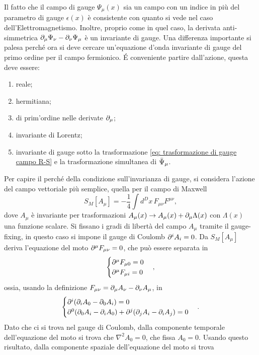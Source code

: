 Il fatto che il campo di gauge $\Psi_\mu(x)$ sia un campo con un indice in più del parametro di gauge $\epsilon(x)$ è consistente con quanto si vede nel caso dell'Elettromagnetismo. Inoltre, proprio come in quel caso, la derivata anti-simmetrica $\partial_\mu\Psi_\nu - \partial_\nu\Psi_\mu$ è un invariante di gauge. Una differenza importante si palesa perché ora si deve cercare un'equazione d'onda invariante di gauge del primo ordine per il campo fermionico. \'E conveniente partire dall'azione, questa deve essere:
\begin{enumerate}
    \item reale;
    \item hermitiana;
    \item di prim'ordine nelle derivate $\partial_\mu$;
    \item invariante di Lorentz;
    \item invariante di gauge sotto la trasformazione \eqref{eq: trasformazione di gauge campo R-S} e la trasformazione simultanea di $\bar{\Psi}_\mu$.
\end{enumerate} 
Per capire il perché della condizione sull'invarianza di gauge, si considera l'azione del campo vettoriale più semplice, quella per il campo di Maxwell
\begin{equation}
    S_M[A_\mu]= -\frac{1}{4}\int d^Dx\,F_{\mu\nu}F^{\mu\nu},
\end{equation}
dove $A_\mu$ è invariante per trasformazioni $A_\mu(x) \to A_\mu(x) + \partial_\mu\Lambda(x)$ con $\Lambda(x)$ una funzione scalare. Si fissano i gradi di libertà del campo $A_\mu$ tramite il gauge-fixing, in questo caso si impone il gauge di Coulomb $\partial^iA_i = 0$. Da $S_M[A_\mu]$ deriva l'equazione del moto $\partial^\mu F_{\mu\nu} = 0$, che può essere separata in 
\begin{equation}
    \begin{cases}
        \partial^\mu F_{\mu 0} = 0 \\
        \partial^\mu F_{\mu i} = 0
    \end{cases},
\end{equation}
ossia, usando la definizione $F_{\mu\nu} = \partial_\mu A_\nu - \partial_\nu A_\mu$, in
\begin{equation}
    \begin{cases}
        \partial^i(\partial_i A_0 - \partial_0 A_i) = 0 \\
        \partial^0(\partial_0 A_i - \partial_i A_0) + \partial^j(\partial_j A_i - \partial_i A_j) = 0
    \end{cases}.
\end{equation}
Dato che ci si trova nel gauge di Coulomb, dalla componente temporale dell'equazione del moto si trova che $\nabla^2 A_0 = 0$, che fissa $A_0 = 0$. Usando questo risultato, dalla componente spaziale dell'equazione del moto si trova 
